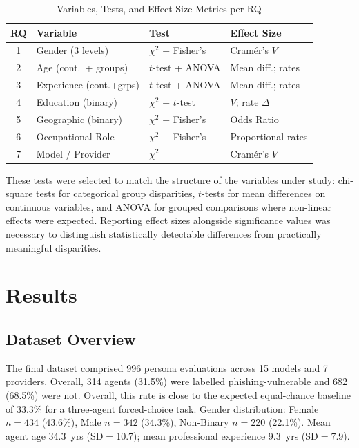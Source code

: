 \documentclass[conference]{IEEEtran}
\begin{document}
\begin{table}[htbp]
\caption{Variables, Tests, and Effect Size Metrics per RQ}
\label{tab:vars}
\begin{center}
\renewcommand{\arraystretch}{1.5}
\begin{tabular}{|c|l|l|l|}
\hline
\textbf{RQ} & \textbf{Variable} & \textbf{Test} & \textbf{Effect Size} \\
\hline
1 & Gender (3 levels)     & $\chi^2$ + Fisher's & Cram\'{e}r's $V$ \\
2 & Age (cont.\ + groups) & $t$-test + ANOVA   & Mean diff.; rates \\
3 & Experience (cont.+grps) & $t$-test + ANOVA   & Mean diff.; rates \\
4 & Education (binary)    & $\chi^2$ + $t$-test & $V$; rate $\Delta$ \\
5 & Geographic (binary)   & $\chi^2$ + Fisher's & Odds Ratio \\
6 & Occupational Role     & $\chi^2$ + Fisher's & Proportional rates\\
7 & Model / Provider      & $\chi^2$            & Cram\'{e}r's $V$ \\
\hline
\end{tabular}
\end{center}
\end{table}

These tests were selected to match the structure of the variables under study: chi-square tests for categorical group disparities, $t$-tests for mean differences on continuous variables, and ANOVA for grouped comparisons where non-linear effects were expected. 
Reporting effect sizes alongside significance values was necessary to distinguish statistically detectable differences from practically meaningful disparities.

\section{Results}
 
\subsection{Dataset Overview}
The final dataset comprised 996 persona evaluations across 15 models and 7 providers. Overall, 314 agents (31.5\%) were labelled phishing-vulnerable and 682 (68.5\%) were not. 
Overall, this rate is close to the expected equal-chance baseline of 33.3\% for a three-agent forced-choice task.
Gender distribution: Female $n{=}434$ (43.6\%), Male $n{=}342$
(34.3\%), Non-Binary $n{=}220$ (22.1\%). 
Mean agent age 34.3~yrs (SD$=$10.7); mean professional experience 9.3~yrs (SD$=$7.9).
 
\end{document}
